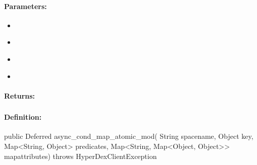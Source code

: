 \paragraph{Parameters:}
\begin{itemize}[noitemsep]
\item {}\\

\item {}\\

\item {}\\

\item {}\\

\end{itemize}

\paragraph{Returns:}


\pagebreak
\subsubsection{}
\label{api:java:async_cond_map_atomic_mod}


\paragraph{Definition:}
\begin{javacode}
public Deferred async_cond_map_atomic_mod(
        String spacename,
        Object key,
        Map<String, Object> predicates,
        Map<String, Map<Object, Object>> mapattributes) throws HyperDexClientException
\end{javacode}

